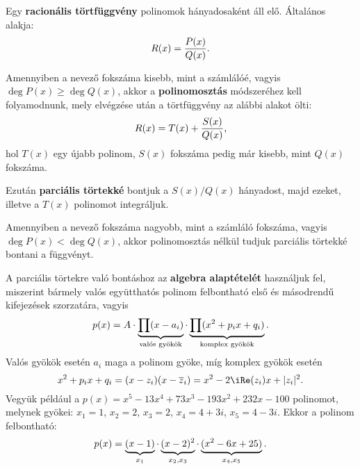 \documentclass[a4paper, 12pt]{scrartcl}
\begin{document}
\begin{blueBox}
  Egy \textbf{racionális törtfüggvény} polinomok hányadosaként áll elő.
  Általános alakja:
  \[
    R(x) = \frac{P(x)}{Q(x)}
    \text.
  \]

  Amennyiben a nevező fokszáma kisebb, mint a számlálóé, vagyis ${\deg P(x) \geq
      \deg Q(x)}$, akkor a \textbf{polinomosztás} módszeréhez kell folyamodnunk,
  mely elvégzése után a törtfüggvény az alábbi alakot ölti:
  \[
    R(x) = T(x) + \frac{S(x)}{Q(x)}
    \text,
  \]
  hol $T(x)$ egy újabb polinom, $S(x)$ fokszáma pedig már kisebb, mint $Q(x)$
  fokszáma.

  Ezután \textbf{parciális törtekké} bontjuk a $S(x) / Q(x)$ hányadost, majd
  ezeket, illetve a $T(x)$ polinomot integráljuk.

  Amennyiben a nevező fokszáma nagyobb, mint a számláló fokszáma, vagyis
  $\deg P(x) < \deg Q(x)$, akkor polinomosztás nélkül tudjuk parciális törtekké
  bontani a függvényt.

  A parciális törtekre való bontáshoz az \textbf{algebra alaptételét} használjuk
  fel, miszerint bármely valós együtthatós polinom felbontható első és
  másodrendű kifejezések szorzatára, vagyis
  \[
    p(x) = A
    \cdot
    \underbrace{\prod (x - a_i)}_{\text{valós gyökök}}
    \cdot
    \underbrace{\prod (x^2 + p_i x + q_i)}_{\text{komplex gyökök}}
    \text.
  \]
  Valós gyökök esetén $a_i$ maga a polinom gyöke, míg komplex gyökök esetén
  \[
    x^2 + p_i x + q_i
    = (x - z_i)(x - \overline z_i)
    = x^2 - 2 \iRe(z_i) x + |z_i|^2
    \text.
  \]
  Vegyük például a $p(x) = x^5 - 13 x^4 + 73 x^3 - 193 x^2 + 232 x - 100$
  polinomot, melynek gyökei: $x_1 = 1$, $x_2 = 2$, $x_3 = 2$, $x_4 = 4 + 3i$,
  $x_5 = 4 - 3i$. Ekkor a polinom felbontható:
  \[
    p(x)
    = \underbrace{(x - 1)}_{x_1}
    \cdot \underbrace{(x - 2)^2}_{x_2, x_3}
    \cdot \underbrace{(x^2 - 6x + 25)}_{x_4, x_5}
    \text.
  \]
\end{blueBox}
\end{document}
